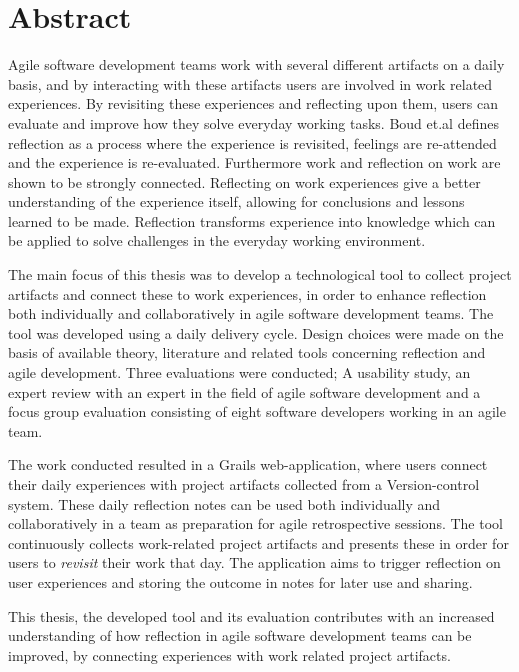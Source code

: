 \section*{Abstract}
Agile software development teams work with several different artifacts on a daily basis, and by interacting with these artifacts users are involved in work related experiences. By revisiting these experiences and reflecting upon them, users can evaluate and improve how they solve everyday working tasks. Boud et.al defines reflection as a process where the experience is revisited, feelings are re-attended and the experience is re-evaluated\citep{boudreflection1985}. 
Furthermore work and reflection on work are shown to be strongly connected\citep{Schon1983}\citep{Chaiklin1993}. Reflecting on work experiences give a better understanding of the experience itself, allowing for conclusions and lessons learned to be made. 
Reflection transforms experience into knowledge which can be applied to solve challenges in the everyday working environment. 

The main focus of this thesis was to develop a technological tool to collect project artifacts and connect these to work experiences, in order to enhance reflection both individually and collaboratively in agile software development teams.
The tool was developed using a daily delivery cycle. Design choices were made on the basis of available theory, literature and related tools concerning reflection and agile development. Three evaluations were conducted; A usability study, an expert review with an expert in the field of agile software development and a focus group evaluation consisting of eight software developers working in an agile team. 

The work conducted resulted in a Grails web-application, where users connect their daily experiences with project artifacts collected from a Version-control system. These daily reflection notes can be used both individually and collaboratively in a team as preparation for agile retrospective sessions. The tool continuously collects work-related project artifacts and presents these in order for users to \emph{revisit} their work that day. The application aims to trigger reflection on user experiences and storing the outcome in notes for later use and sharing.

This thesis, the developed tool and its evaluation contributes with an increased understanding of how reflection in agile software development teams can be improved, by connecting experiences with work related project artifacts. 

